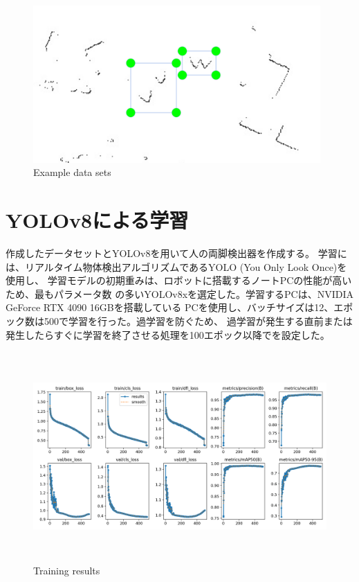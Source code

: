 \begin{figure}[h]
    \begin{center}
    \includegraphics[height=60mm,clip]{figure/Example-data-sets.png}
    \caption{Example data sets}
    \label{Example data sets}
    \end{center}
\end{figure}

\section{YOLOv8による学習}
作成したデータセットとYOLOv8を用いて人の両脚検出器を作成する。
学習には、リアルタイム物体検出アルゴリズムであるYOLO (You Only Look Once)を使用し、
学習モデルの初期重みは、ロボットに搭載するノートPCの性能が高いため、最もパラメータ数
の多いYOLOv8xを選定した。学習するPCは、NVIDIA GeForce RTX 4090 16GBを搭載している
PCを使用し、バッチサイズは12、エポック数は500で学習を行った。過学習を防ぐため、
過学習が発生する直前または発生したらすぐに学習を終了させる処理を100エポック以降でを設定した。

\begin{figure}[h]
    \begin{center}
    \includegraphics[height=80mm,clip]{figure/yolov8-train-results.png}
    \caption{Training results}
    \label{Training results}
    \end{center}
\end{figure}

